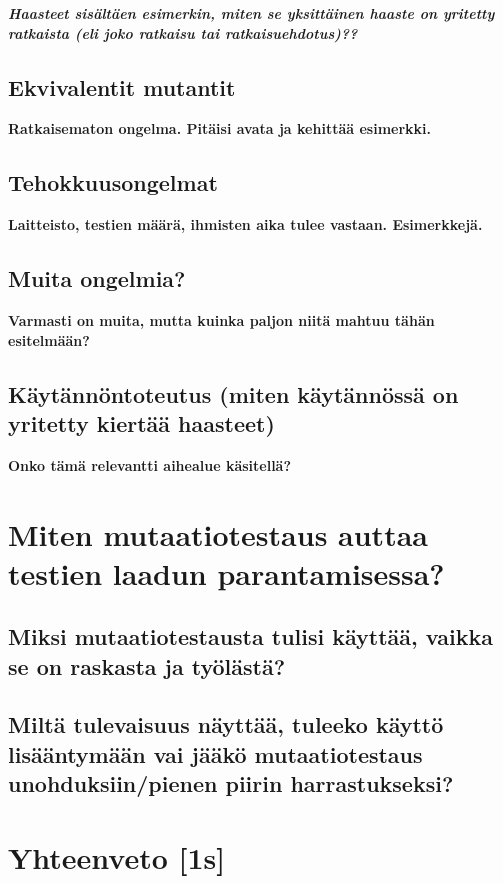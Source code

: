 \documentclass[finnish, grading]{tktltiki2}
\theoremstyle{definition}
\theoremstyle{remark}
\begin{document}
\textbf{\textit{Haasteet sisältäen esimerkin, miten se yksittäinen haaste on yritetty ratkaista (eli joko ratkaisu tai ratkaisuehdotus)??}}

\subsection{Ekvivalentit mutantit}

\textbf{Ratkaisematon ongelma. Pitäisi avata ja kehittää esimerkki.}

\subsection{Tehokkuusongelmat}

\textbf{Laitteisto, testien määrä, ihmisten aika tulee vastaan. Esimerkkejä.}

\subsection{Muita ongelmia?}

\textbf{Varmasti on muita, mutta kuinka paljon niitä mahtuu tähän esitelmään?}

\subsection{Käytännöntoteutus (miten käytännössä on yritetty kiertää haasteet)}

\textbf{Onko tämä relevantti aihealue käsitellä?}

\section{Miten mutaatiotestaus auttaa testien laadun parantamisessa?}


\subsection{Miksi mutaatiotestausta tulisi käyttää, vaikka se on raskasta ja työlästä?}

\subsection{Miltä tulevaisuus näyttää, tuleeko käyttö lisääntymään vai jääkö mutaatiotestaus unohduksiin/pienen piirin harrastukseksi?}


\section{Yhteenveto [1s]}
\end{document}
